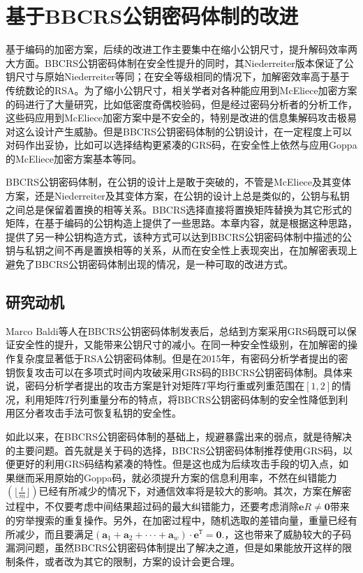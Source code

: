 \chapter{基于BBCRS公钥密码体制的改进}
基于编码的加密方案，后续的改进工作主要集中在缩小公钥尺寸，提升解码效率两大方面。BBCRS公钥密码体制在安全性提升的同时，其Niederreiter版本保证了公钥尺寸与原始Niederreiter等同；在安全等级相同的情况下，加解密效率高于基于传统数论的RSA。为了缩小公钥尺寸，相关学者对各种能应用到McEliece加密方案的码进行了大量研究，比如低密度奇偶校验码，但是经过密码分析者的分析工作，这些码应用到McEliece加密方案中是不安全的，特别是改进的信息集解码攻击极易对这么设计产生威胁。但是BBCRS公钥密码体制的公钥设计，在一定程度上可以对码作出妥协，比如可以选择结构更紧凑的GRS码，在安全性上依然与应用Goppa的McEliece加密方案基本等同。

BBCRS公钥密码体制，在公钥的设计上是敢于突破的，不管是McEliece及其变体方案，还是Niederreiter及其变体方案，在公钥的设计上总是类似的，公钥与私钥之间总是保留着置换的相等关系。BBCRS选择直接将置换矩阵替换为其它形式的矩阵，在基于编码的公钥构造上提供了一些思路。本章内容，就是根据这种思路，提供了另一种公钥构造方式，该种方式可以达到BBCRS公钥密码体制中描述的公钥与私钥之间不再是置换相等的关系，从而在安全性上表现突出，在加解密表现上避免了BBCRS公钥密码体制出现的情况，是一种可取的改进方式。

\section{研究动机}
Marco Baldi等人在BBCRS公钥密码体制发表后，总结到方案采用GRS码既可以保证安全性的提升，又能带来公钥尺寸的减小。在同一种安全性级别，在加解密的操作复杂度显著低于RSA公钥密码体制。但是在2015年，有密码分析学者提出的密钥恢复攻击可以在多项式时间内攻破采用GRS码的BBCRS公钥密码体制。具体来说，密码分析学者提出的攻击方案是针对矩阵$T$平均行重或列重范围在$[1,2]$的情况，利用矩阵$T$行列重量分布的特点，将BBCRS公钥密码体制的安全性降低到利用区分者攻击手法可恢复私钥的安全性。

如此以来，在BBCRS公钥密码体制的基础上，规避暴露出来的弱点，就是待解决的主要问题。首先就是关于码的选择，BBCRS公钥密码体制推荐使用GRS码，以便更好的利用GRS码结构紧凑的特性。但是这也成为后续攻击手段的切入点，如果继而采用原始的Goppa码，就必须提升方案的信息利用率，不然在纠错能力$(\lfloor \frac{t}{m} \rfloor)$已经有所减少的情况下，对通信效率将是较大的影响。其次，方案在解密过程中，不仅要考虑中间结果超过码的最大纠错能力，还要考虑消除$\mathbf{e}R \neq \mathbf{0}$带来的穷举搜索的重复操作。另外，在加密过程中，随机选取的差错向量，重量已经有所减少，而且要满足$(\mathbf{a}_1 + \mathbf{a}_2 + ··· + \mathbf{a}_w) \cdot \mathbf{e}^\mathtt{T} = \mathbf{0}.$，这也带来了威胁较大的子码漏洞问题，虽然BBCRS公钥密码体制提出了解决之道，但是如果能放开这样的限制条件，或者改为其它的限制，方案的设计会更合理。

